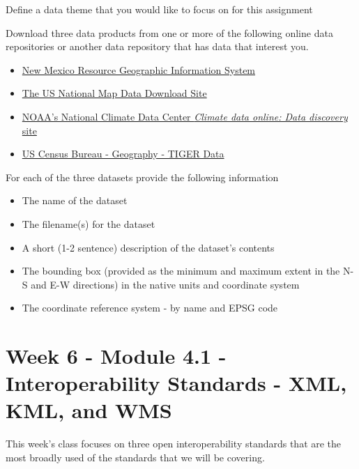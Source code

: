 \documentclass[]{book}
\providecommand{\tightlist}{%
  \setlength{\itemsep}{0pt}\setlength{\parskip}{0pt}}
\begin{document}
\begin{description}
\tightlist
\item[Question 1]
Define a data theme that you would like to focus on for this assignment
\end{description}

Download three data products from one or more of the following online
data repositories or another data repository that has data that interest
you.

\begin{itemize}
\tightlist
\item
  \href{http://rgis.unm.edu/}{New Mexico Resource Geographic Information
  System}
\item
  \href{http://nationalmap.gov/small_scale/atlasftp.html}{The US
  National Map Data Download Site}
\item
  \href{http://www.ncdc.noaa.gov/cdo-web/datasets}{NOAA's National
  Climate Data Center \emph{Climate data online: Data discovery} site}
\item
  \href{http://www.census.gov/geo/maps-data/data/tiger.html}{US Census
  Bureau - Geography - TIGER Data}
\end{itemize}

\begin{description}
\tightlist
\item[Question 2]
For each of the three datasets provide the following information
\end{description}

\begin{itemize}
\tightlist
\item
  The name of the dataset
\item
  The filename(s) for the dataset
\item
  A short (1-2 sentence) description of the dataset's contents
\item
  The bounding box (provided as the minimum and maximum extent in the
  N-S and E-W directions) in the native units and coordinate system
\item
  The coordinate reference system - by name and EPSG code
\end{itemize}

\chapter{Week 6 - Module 4.1 - Interoperability Standards - XML, KML,
and WMS}\label{week06}

This week's class focuses on three open interoperability standards that
are the most broadly used of the standards that we will be covering.
\end{document}
